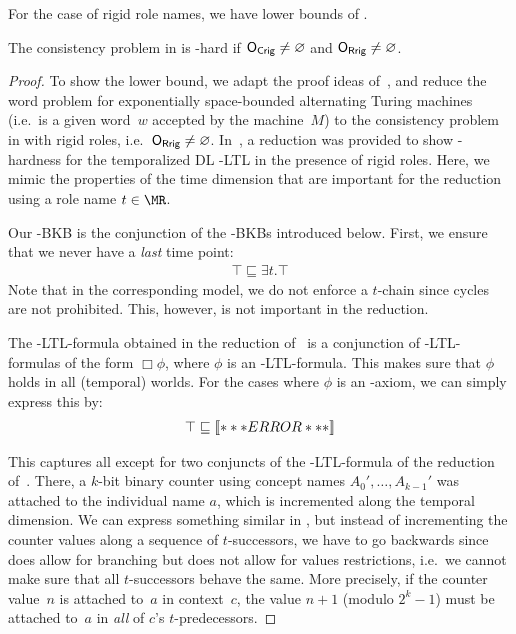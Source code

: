 For the case of rigid role names, we have lower bounds of \TwoExpTime.

\begin{theorem}\label{thm:el-lower-2exp}
  The consistency problem in \ELALC is \TwoExpTime-hard if $\mathsf{O_{Crig}} \neq \varnothing$ and
  $\mathsf{O_{Rrig}} \neq \varnothing$.
\end{theorem}

\begin{proof}
   To show the lower bound, we adapt the proof ideas
  of~\cite{BaGL-KR08,BaGL-ToCL12}, and reduce the word problem for exponentially space-bounded
  alternating Turing machines (i.e.~is a given word~$w$ accepted by the machine~$M$) to the
  consistency problem in \ELALC with rigid roles, i.e.~$\mathsf{O_{Rrig}}\ne\varnothing$.
  In~\cite{BaGL-KR08,BaGL-ToCL12}, a reduction was provided to show \TwoExpTime-hardness for the
  temporalized DL \ALC-LTL in the presence of rigid roles.
  Here, we mimic the properties of the time dimension that are important for the reduction using a
  role name $t\in\MR$.

  Our \ELALC-BKB is the conjunction of the \ELALC-BKBs introduced below.
  First, we ensure that we never have a \emph{last} time point:
  \begin{gather*}
    \top\sqsubseteq\exists t.\top
  \end{gather*}
  Note that in the corresponding model, we do not enforce a $t$-chain since cycles are not
  prohibited.  This, however, is not important in the reduction.

  The \ALC-LTL-formula obtained in the reduction of~\cite{BaGL-KR08,BaGL-ToCL12} is a conjunction of
  \ALC-LTL-formulas of the form $\Box\phi$, where $\phi$ is an \ALC-LTL-formula.  This makes sure
  that $\phi$ holds in all (temporal) worlds.  For the cases where $\phi$ is an \ALC-axiom, we can
  simply express this by:
  \begin{gather*}
    \top\sqsubseteq\mathord{\left\llbracket***ERROR***\right\rrbracket}
  \end{gather*}

  This captures all except for two conjuncts of the \ALC-LTL-formula of the reduction
  of~\cite{BaGL-KR08,BaGL-ToCL12}.  There, a $k$-bit binary counter using concept names
  $A_0',\dots,A_{k-1}'$ was attached to the individual name $a$, which is incremented along the
  temporal dimension.  We can express something similar in \ELALC, but instead of incrementing the
  counter values along a sequence of $t$-successors, we have to go backwards since \EL does allow
  for branching but does not allow for values restrictions, i.e.~we cannot make sure that all
  $t$-successors behave the same.  More precisely, if the counter value~$n$ is attached to~$a$ in
  context~$c$, the value $n+1$ (modulo $2^k-1$) must be attached to~$a$ in \emph{all} of $c$'s
  $t$-predecessors.


\end{proof}
